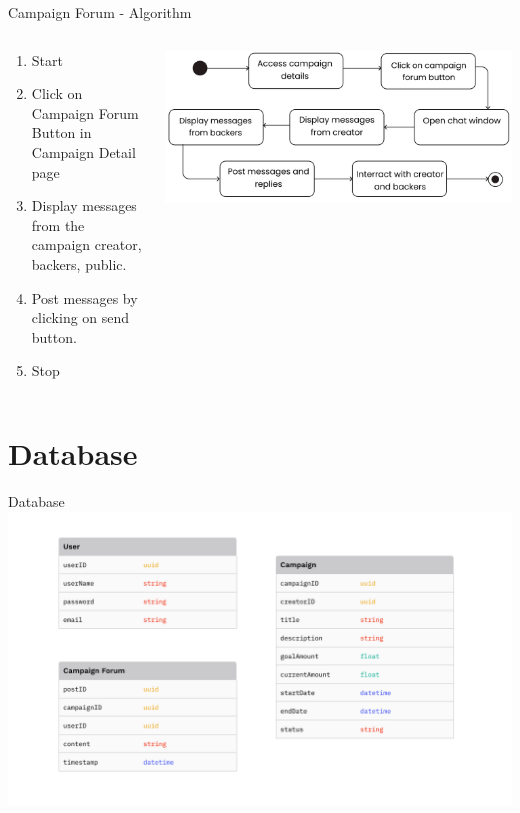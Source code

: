 \documentclass{beamer}
\begin{document}
\begin{frame}{Campaign Forum - Algorithm}
  \setlength{\itemsep}{4pt}
   \begin{columns}[T]
        \begin{column}{0.48\textwidth}
        \fontsize{10}{12}\selectfont
        \begin{enumerate}
            \item Start
            \item Click on Campaign Forum Button in Campaign Detail page
            \item Display messages from the campaign creator, backers, public.
            \item Post messages by clicking on send button.
            \item Stop
        \end{enumerate}
        \end{column}
        \begin{column}{0.68\textwidth}
          \vspace{10pt}
            \begin{center}
                 \includegraphics[width=\linewidth]{assets/forum_state_chart.png} 
            \end{center}
        \end{column}
    \end{columns}
    \end{frame}



\section{Database}
\begin{frame}{Database}
\hspace*{-1cm}
\includegraphics[width=1\paperwidth]{assets/Database.png}
\end{frame}
\end{document}
